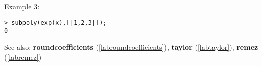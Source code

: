 \noindent Example 3: 
\begin{center}\begin{minipage}{15cm}\begin{Verbatim}[frame=single]
> subpoly(exp(x),[|1,2,3|]);
0
\end{Verbatim}
\end{minipage}\end{center}
See also: \textbf{roundcoefficients} (\ref{labroundcoefficients}), \textbf{taylor} (\ref{labtaylor}), \textbf{remez} (\ref{labremez})
